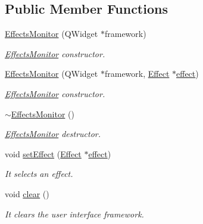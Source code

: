 \subsection*{Public Member Functions}
\begin{DoxyCompactItemize}
\item 
\hyperlink{class_effects_monitor_a484d2e47c270b1a9f608dd7c2c7e3994}{Effects\+Monitor} (Q\+Widget $\ast$framework)
\begin{DoxyCompactList}\small\item\em \hyperlink{class_effects_monitor}{Effects\+Monitor} constructor. \end{DoxyCompactList}\item 
\hyperlink{class_effects_monitor_ad9215233b6d88585ec5d31ca4f35771a}{Effects\+Monitor} (Q\+Widget $\ast$framework, \hyperlink{class_effect}{Effect} $\ast$\hyperlink{class_effects_monitor_a4ec98ceedd0d8bea006da1fc97f02124}{effect})
\begin{DoxyCompactList}\small\item\em \hyperlink{class_effects_monitor}{Effects\+Monitor} constructor. \end{DoxyCompactList}\item 
\mbox{\label{class_effects_monitor_aeb3a098669694d424d02c3ed8294d923}} 
\hyperlink{class_effects_monitor_aeb3a098669694d424d02c3ed8294d923}{$\sim$\+Effects\+Monitor} ()
\begin{DoxyCompactList}\small\item\em \hyperlink{class_effects_monitor}{Effects\+Monitor} destructor. \end{DoxyCompactList}\item 
void \hyperlink{class_effects_monitor_ade184df36063a2c7ef2855c12265bd78}{set\+Effect} (\hyperlink{class_effect}{Effect} $\ast$\hyperlink{class_effects_monitor_a4ec98ceedd0d8bea006da1fc97f02124}{effect})
\begin{DoxyCompactList}\small\item\em It selects an effect. \end{DoxyCompactList}\item 
\mbox{\label{class_effects_monitor_ad6ad01ab2de7ca57a57e5fb71c2f85d9}} 
void \hyperlink{class_effects_monitor_ad6ad01ab2de7ca57a57e5fb71c2f85d9}{clear} ()
\begin{DoxyCompactList}\small\item\em It clears the user interface framework. \end{DoxyCompactList}\item 

\end{DoxyCompactItemize}
